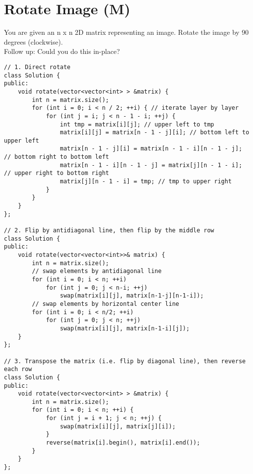 \section{Rotate Image (M)}
You are given an n x n 2D matrix representing an image. Rotate the image by 90 degrees (clockwise).\\

Follow up: Could you do this in-place?\\

\begin{lstlisting}
// 1. Direct rotate
class Solution {
public:
    void rotate(vector<vector<int> > &matrix) {
        int n = matrix.size();
        for (int i = 0; i < n / 2; ++i) { // iterate layer by layer
            for (int j = i; j < n - 1 - i; ++j) {
                int tmp = matrix[i][j]; // upper left to tmp
                matrix[i][j] = matrix[n - 1 - j][i]; // bottom left to upper left
                matrix[n - 1 - j][i] = matrix[n - 1 - i][n - 1 - j]; // bottom right to bottom left
                matrix[n - 1 - i][n - 1 - j] = matrix[j][n - 1 - i]; // upper right to bottom right
                matrix[j][n - 1 - i] = tmp; // tmp to upper right
            }
        }
    }
};

// 2. Flip by antidiagonal line, then flip by the middle row
class Solution {
public:
    void rotate(vector<vector<int>>& matrix) {
        int n = matrix.size();
        // swap elements by antidiagonal line
        for (int i = 0; i < n; ++i)
            for (int j = 0; j < n-i; ++j)
                swap(matrix[i][j], matrix[n-1-j][n-1-i]);
        // swap elements by horizontal center line        
        for (int i = 0; i < n/2; ++i)
            for (int j = 0; j < n; ++j)
                swap(matrix[i][j], matrix[n-1-i][j]);
    }
};

// 3. Transpose the matrix (i.e. flip by diagonal line), then reverse each row
class Solution {
public:
    void rotate(vector<vector<int> > &matrix) {
        int n = matrix.size();
        for (int i = 0; i < n; ++i) {
            for (int j = i + 1; j < n; ++j) {
                swap(matrix[i][j], matrix[j][i]);
            }
            reverse(matrix[i].begin(), matrix[i].end());
        }
    }
};
\end{lstlisting}


